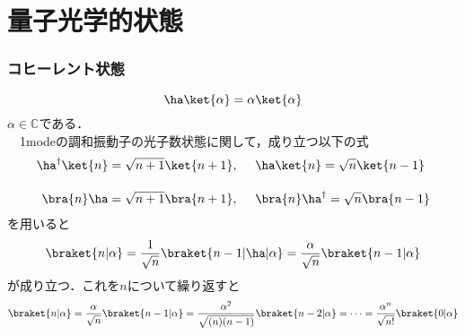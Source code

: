 \part{量子光学的状態}
\section{コヒーレント状態}
\begin{equation}
    \ha\ket{\alpha}=\alpha\ket{\alpha}
\end{equation}
$\alpha\in\mathbb{C}$である．\\
　1modeの調和振動子の光子数状態に関して，成り立つ以下の式
\begin{align}
    \ha^\dag\ket{n}&=\sqrt{n+1}\ket{n+1},\ \ \ \ \ha\ket{n}=\sqrt{n}\ket{n-1}\\[10pt]
    \bra{n}\ha&=\sqrt{n+1}\bra{n+1},\ \ \ \ \bra{n}\ha^\dag=\sqrt{n}\bra{n-1}
\end{align}
を用いると
\begin{equation}
    \braket{n|\alpha}=\frac{1}{\sqrt{n}}\braket{n-1|\ha|\alpha}
    =\frac{\alpha}{\sqrt{n}}\braket{n-1|\alpha}
\end{equation}
が成り立つ．これを$n$について繰り返すと
\begin{equation}
    \braket{n|\alpha}
    =\frac{\alpha}{\sqrt{n}}\braket{n-1|\alpha}
    =\frac{\alpha^2}{\sqrt{(n)(n-1)}}\braket{n-2|\alpha}
    =\cdots=\frac{\alpha^n}{\sqrt{n!}}\braket{0|\alpha}
\end{equation}

